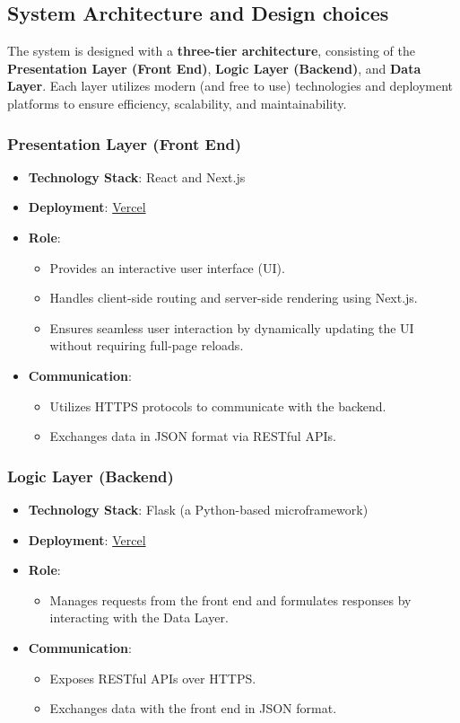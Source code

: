 \subsection{System Architecture and Design choices}
The system is designed with a \textbf{three-tier architecture}, consisting of the \textbf{Presentation Layer (Front End)}, \textbf{Logic Layer (Backend)}, and \textbf{Data Layer}. Each layer utilizes modern (and free to use) technologies and deployment platforms to ensure efficiency, scalability, and maintainability.

\subsubsection{Presentation Layer (Front End)}

\begin{itemize}
\item \textbf{Technology Stack}: React and Next.js
\item \textbf{Deployment}: \href{https://vercel.com/}{Vercel}
\item \textbf{Role}:
\begin{itemize}
\item Provides an interactive user interface (UI).
\item Handles client-side routing and server-side rendering using Next.js.
\item Ensures seamless user interaction by dynamically updating the UI without requiring full-page reloads.
\end{itemize}
\item \textbf{Communication}:
\begin{itemize}
\item Utilizes HTTPS protocols to communicate with the backend.
\item Exchanges data in JSON format via RESTful APIs.
\end{itemize}
\end{itemize}

\subsubsection{Logic Layer (Backend)}

\begin{itemize}
\item \textbf{Technology Stack}: Flask (a Python-based microframework)
\item \textbf{Deployment}: \href{https://vercel.com/}{Vercel}
\item \textbf{Role}:
\begin{itemize}
\item Manages requests from the front end and formulates responses by interacting with the Data Layer.
\end{itemize}
\item \textbf{Communication}:
\begin{itemize}
\item Exposes RESTful APIs over HTTPS.
\item Exchanges data with the front end in JSON format.
\end{itemize}
\end{itemize}

